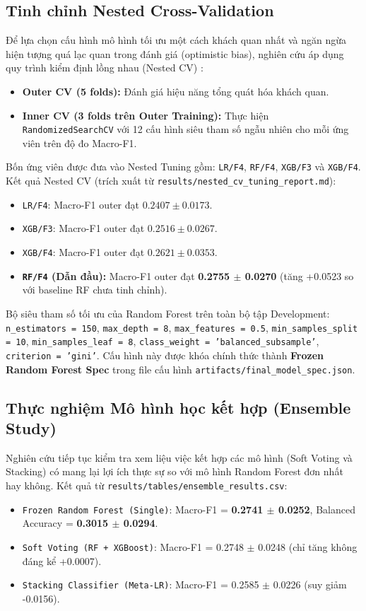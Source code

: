 \subsection{Tinh chỉnh Nested Cross-Validation}
Để lựa chọn cấu hình mô hình tối ưu một cách khách quan nhất và ngăn ngừa hiện tượng quá lạc quan trong đánh giá (optimistic bias), nghiên cứu áp dụng quy trình kiểm định lồng nhau (Nested CV) \cite{varma2006bias}:
\begin{itemize}
    \item \textbf{Outer CV (5 folds):} Đánh giá hiệu năng tổng quát hóa khách quan.
    \item \textbf{Inner CV (3 folds trên Outer Training):} Thực hiện \texttt{RandomizedSearchCV} với 12 cấu hình siêu tham số ngẫu nhiên cho mỗi ứng viên trên độ đo Macro-F1.
\end{itemize}

Bốn ứng viên được đưa vào Nested Tuning gồm: \texttt{LR/F4}, \texttt{RF/F4}, \texttt{XGB/F3} và \texttt{XGB/F4}. Kết quả Nested CV (trích xuất từ \texttt{results/nested\_cv\_tuning\_report.md}):
\begin{itemize}
    \item \texttt{LR/F4}: Macro-F1 outer đạt $0.2407 \pm 0.0173$.
    \item \texttt{XGB/F3}: Macro-F1 outer đạt $0.2516 \pm 0.0267$.
    \item \texttt{XGB/F4}: Macro-F1 outer đạt $0.2621 \pm 0.0353$.
    \item \textbf{\texttt{RF/F4} (Dẫn đầu):} Macro-F1 outer đạt \textbf{0.2755 $\pm$ 0.0270} (tăng +0.0523 so với baseline RF chưa tinh chỉnh).
\end{itemize}

Bộ siêu tham số tối ưu của Random Forest trên toàn bộ tập Development: \texttt{n\_estimators = 150}, \texttt{max\_depth = 8}, \texttt{max\_features = 0.5}, \texttt{min\_samples\_split = 10}, \texttt{min\_samples\_leaf = 8}, \texttt{class\_weight = 'balanced\_subsample'}, \texttt{criterion = 'gini'}. Cấu hình này được khóa chính thức thành \textbf{Frozen Random Forest Spec} trong file cấu hình \texttt{artifacts/final\_model\_spec.json}.

\subsection{Thực nghiệm Mô hình học kết hợp (Ensemble Study)}
Nghiên cứu tiếp tục kiểm tra xem liệu việc kết hợp các mô hình (Soft Voting và Stacking) có mang lại lợi ích thực sự so với mô hình Random Forest đơn nhất hay không. Kết quả từ \texttt{results/tables/ensemble\_results.csv}:
\begin{itemize}
    \item \texttt{Frozen Random Forest (Single)}: Macro-F1 = \textbf{0.2741 $\pm$ 0.0252}, Balanced Accuracy = \textbf{0.3015 $\pm$ 0.0294}.
    \item \texttt{Soft Voting (RF + XGBoost)}: Macro-F1 = 0.2748 $\pm$ 0.0248 (chỉ tăng không đáng kể +0.0007).
    \item \texttt{Stacking Classifier (Meta-LR)}: Macro-F1 = 0.2585 $\pm$ 0.0226 (suy giảm -0.0156).
\end{itemize}

